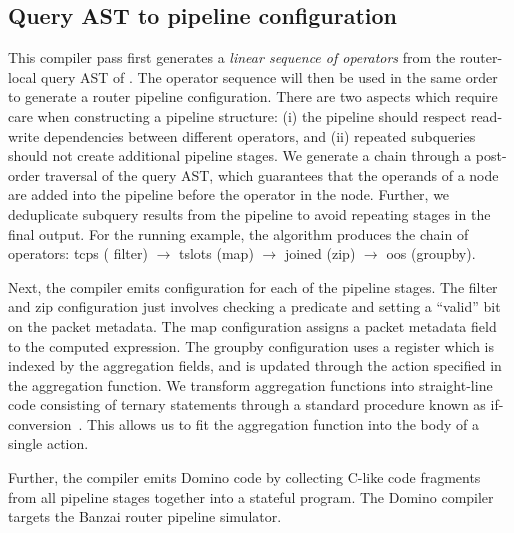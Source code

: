 \subsection{Query AST to pipeline configuration}
\label{sec:pipeline-layout}

This compiler pass first generates a {\em linear sequence of operators} from the
router-local query AST of . The operator sequence
will then be used in the same order to generate a router pipeline
configuration. There are two aspects which require care when constructing a
pipeline structure: (i) the pipeline should respect read-write dependencies
between different operators, and (ii) repeated subqueries should not create
additional pipeline stages. We generate a chain through a post-order traversal
of the query AST, which guarantees that the operands of a node are added into
the pipeline before the operator in the node. Further, we deduplicate subquery
results from the pipeline to avoid repeating stages in the final output. For the
running example, the algorithm produces the chain of operators: {\ct tcps} ({\ct
  filter}) $\rightarrow$ {\ct tslots} ({\ct map}) $\rightarrow$ {\ct joined}
({\ct zip}) $\rightarrow$ {\ct oos} ({\ct groupby}).

Next, the compiler emits \pfs configuration for each of the pipeline stages. The
{\ct filter} and {\ct zip} configuration just involves checking a predicate and
setting a ``valid'' bit on the packet metadata. The {\ct map} configuration
assigns a packet metadata field to the computed expression. The {\ct groupby}
configuration uses a register which is indexed by the aggregation fields, and is
updated through the action specified in the aggregation function. We transform
\TheSystem aggregation functions into straight-line code consisting of ternary
statements through a standard procedure known as
if-conversion~\cite{if-conversion}. This allows us to fit the aggregation
function into the body of a single \pfs action.

Further, the \TheSystem compiler emits Domino code by collecting C-like code
fragments from all pipeline stages together into a stateful program. The Domino
compiler targets the Banzai router pipeline simulator.

